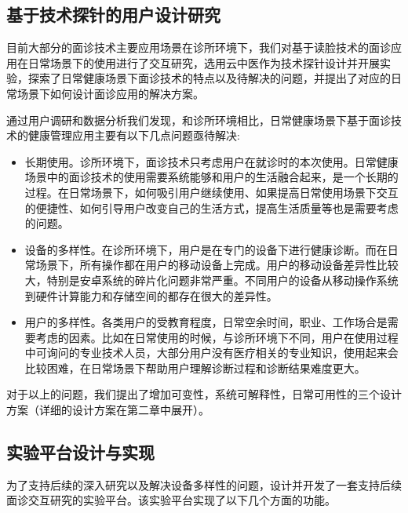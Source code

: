 \subsection{基于技术探针的用户设计研究}

目前大部分的面诊技术主要应用场景在诊所环境下，我们对基于读脸技术的面诊应用在日常场景下的使用进行了交互研究，选用云中医作为技术探针设计并开展实验，探索了日常健康场景下面诊技术的特点以及待解决的问题，并提出了对应的日常场景下如何设计面诊应用的解决方案。

通过用户调研和数据分析我们发现，和诊所环境相比，日常健康场景下基于面诊技术的健康管理应用主要有以下几点问题亟待解决: 

\begin{itemize}
    
    \item 长期使用。诊所环境下，面诊技术只考虑用户在就诊时的本次使用。日常健康场景中的面诊技术的使用需要系统能够和用户的生活融合起来，是一个长期的过程。在日常场景下，如何吸引用户继续使用、如果提高日常使用场景下交互的便捷性、如何引导用户改变自己的生活方式，提高生活质量等也是需要考虑的问题。

    \item 设备的多样性。在诊所环境下，用户是在专门的设备下进行健康诊断。而在日常场景下，所有操作都在用户的移动设备上完成。用户的移动设备差异性比较大，特别是安卓系统的碎片化问题非常严重。不同用户的设备从移动操作系统到硬件计算能力和存储空间的都存在很大的差异性。
    
    \item 用户的多样性。各类用户的受教育程度，日常空余时间，职业、工作场合是需要考虑的因素。比如在日常使用的时候，与诊所环境下不同，用户在使用过程中可询问的专业技术人员，大部分用户没有医疗相关的专业知识，使用起来会比较困难，在日常场景下帮助用户理解诊断过程和诊断结果难度更大。

\end{itemize}

对于以上的问题，我们提出了增加可变性，系统可解释性，日常可用性的三个设计方案（详细的设计方案在第二章中展开）。

\subsection{实验平台设计与实现}

为了支持后续的深入研究以及解决设备多样性的问题，设计并开发了一套支持后续面诊交互研究的实验平台。该实验平台实现了以下几个方面的功能。

